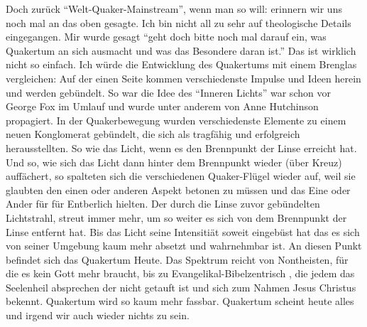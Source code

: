 Doch zurück "`Welt-Quaker-Mainstream"', wenn man so will: erinnern wir uns noch mal
an das oben gesagte. Ich bin nicht all zu sehr auf theologische Details
eingegangen. Mir wurde gesagt "`geht doch bitte noch mal darauf ein, was
Quakertum an sich ausmacht und was das Besondere daran ist."' Das ist wirklich
nicht so einfach. Ich würde die Entwicklung des Quakertums mit einem Brenglas
vergleichen: Auf der einen Seite kommen verschiedenste Impulse und Ideen herein
und werden gebündelt. So war die Idee des "`Inneren Lichts"' war schon vor
George Fox im Umlauf und wurde unter anderem von Anne Hutchinson propagiert. In der
Quakerbewegung wurden verschiedenste Elemente zu einem neuen Konglomerat
gebündelt, die sich als tragfähig und erfolgreich herausstellten.
So wie das Licht, wenn
es den Brennpunkt der Linse erreicht hat. Und so, wie sich das Licht dann hinter dem Brennpunkt wieder (über Kreuz) auffächert, so spalteten sich die verschiedenen Quaker-Flügel wieder auf, weil sie glaubten den einen oder anderen Aspekt betonen zu müssen und das Eine oder Ander für für Entberlich hielten. Der durch die Linse zuvor gebündelten
Lichtstrahl, streut immer mehr, um so weiter es sich von dem
Brennpunkt der Linse entfernt hat. Bis das Licht seine Intensitiät soweit eingebüst hat das es sich von seiner Umgebung kaum mehr absetzt und wahrnehmbar ist. An diesen
Punkt befindet sich das Quakertum Heute. Das Spektrum reicht von Nontheisten, für die
es kein Gott mehr braucht, bis zu Evangelikal-Bibelzentrisch , die jedem das
Seelenheil absprechen der nicht getauft ist und sich zum Nahmen Jesus Christus
bekennt. Quakertum wird so kaum mehr fassbar. Quakertum scheint heute alles und irgend wir auch wieder nichts zu sein.

\begin{center}

\end{center}

\medskip

